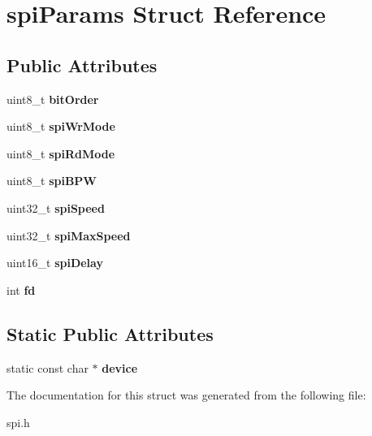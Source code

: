 \hypertarget{structspiParams}{\section{spi\-Params Struct Reference}
\label{structspiParams}
}
\subsection*{Public Attributes}
\begin{DoxyCompactItemize}
\item 
\hypertarget{structspiParams_a943b444e77f506b67c26334326be4caf}{uint8\-\_\-t {\bfseries bit\-Order}}\label{structspiParams_a943b444e77f506b67c26334326be4caf}

\item 
\hypertarget{structspiParams_abf2bae4035ced0c45ced2618c2150d66}{uint8\-\_\-t {\bfseries spi\-Wr\-Mode}}\label{structspiParams_abf2bae4035ced0c45ced2618c2150d66}

\item 
\hypertarget{structspiParams_a24ce28ae11d13edb3cc2611790f74448}{uint8\-\_\-t {\bfseries spi\-Rd\-Mode}}\label{structspiParams_a24ce28ae11d13edb3cc2611790f74448}

\item 
\hypertarget{structspiParams_adfa9ae8f40748929cd125f2a2627a490}{uint8\-\_\-t {\bfseries spi\-B\-P\-W}}\label{structspiParams_adfa9ae8f40748929cd125f2a2627a490}

\item 
\hypertarget{structspiParams_a29a2a33adc949277f980d55c573bcb07}{uint32\-\_\-t {\bfseries spi\-Speed}}\label{structspiParams_a29a2a33adc949277f980d55c573bcb07}

\item 
\hypertarget{structspiParams_ac6af66e49fb2c4f84b4fd09e7f2df147}{uint32\-\_\-t {\bfseries spi\-Max\-Speed}}\label{structspiParams_ac6af66e49fb2c4f84b4fd09e7f2df147}

\item 
\hypertarget{structspiParams_a7d276b4bdd88c78495a6d87919ea9664}{uint16\-\_\-t {\bfseries spi\-Delay}}\label{structspiParams_a7d276b4bdd88c78495a6d87919ea9664}

\item 
\hypertarget{structspiParams_a75dcaec546d7e6c605f854871b6cf2ca}{int {\bfseries fd}}\label{structspiParams_a75dcaec546d7e6c605f854871b6cf2ca}

\end{DoxyCompactItemize}
\subsection*{Static Public Attributes}
\begin{DoxyCompactItemize}
\item 
\hypertarget{structspiParams_a6f2ed69ae1dc110d7cd3de5e6b145a94}{static const char $\ast$ {\bfseries device}}\label{structspiParams_a6f2ed69ae1dc110d7cd3de5e6b145a94}

\end{DoxyCompactItemize}


The documentation for this struct was generated from the following file\-:\begin{DoxyCompactItemize}
\item 
spi.\-h\end{DoxyCompactItemize}
